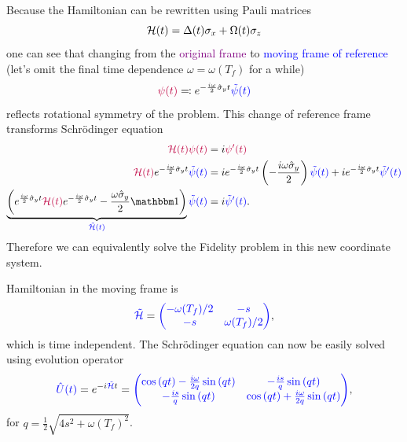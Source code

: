 Because the Hamiltonian can be rewritten using Pauli matrices
\begin{equation}
    \mathcal{H}(t) = \Delta(t)\sigma_x+ \Omega(t)\sigma_z
\end{equation}
one can see that changing from the \textcolor{purple}{original frame} to \textcolor{blue}{moving frame of reference} (let's omit the final time dependence $\omega=\omega(T_f)$ for a while) 
\begin{equation}
    \textcolor{purple}{\psi(t)} \eqqcolon e^{-\frac{i \omega}{2}\hat\sigma_y t} \textcolor{blue}{\tilde\psi(t)}
\end{equation}
reflects rotational symmetry of the problem. This change of reference frame transforms Schr\"odinger equation
\begin{equation}
    \begin{split}
        \textcolor{purple}{\H(t)\psi(t)} &= i\textcolor{purple}{\psi'(t)}\\
        \textcolor{purple}{\H(t)} \expsm\textcolor{blue}{\tilde\psi(t)} &= i \expsm \left(-\frac{i\omega\hat\sigma_y}{2}\right)\textcolor{blue}{\tilde\psi(t)}+i\expsm\textcolor{blue}{\tilde\psi'(t)}\\
        \underbrace{\left(\expsp \textcolor{purple}{\H(t)}\expsm- \frac{\omega\hat\sigma_y}{2}\Id\right)}_{\textcolor{blue}{\tilde\H(t)}}\textcolor{blue}{\tilde\psi(t)}&=i\textcolor{blue}{\tilde\psi'(t)}.
    \end{split}
\end{equation}
Therefore we can equivalently solve the Fidelity problem in this new coordinate system.

Hamiltonian in the moving frame is
\begin{equation}
    \textcolor{blue}{\tilde{\mathcal{H}}}=\textcolor{blue}{\begin{pmatrix}
        -\omega(T_f)/2&-s\\
        -s&\omega(T_f)/2
    \end{pmatrix}},
\end{equation}
which is time independent. The Schr\"odinger equation can now be easily solved using evolution operator
\begin{equation}
    \textcolor{blue}{\hat U(t)}=e^{-i\textcolor{blue}{\tilde{\mathcal{H}}}t}=\textcolor{blue}{\begin{pmatrix}
        \cos{(qt)}-\frac{i\omega}{2q}\sin{(qt)} & -\frac{is}{q}\sin{(qt)}\\
        -\frac{is}{q}\sin{(qt)}&\cos{(qt)}+\frac{i\omega}{2q}\sin{(qt)}
    \end{pmatrix}},
\end{equation}
for $q=\frac{1}{2}\sqrt{4s^2+\omega(T_f)^2}$.

